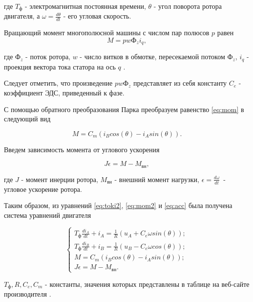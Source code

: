 где $T_{\text{ф}}$ - электромагнитная постоянная времени, $\theta$ - угол
поворота ротора двигателя, а $\omega=\frac{d\theta}{dt}$ - его угловая скорость.

Вращающий момент многополюсной машины с числом пар полюсов $p$ равен
\begin{equation}
  M=pw\text{Ф}_zi_q,
  \label{eq:mom}
\end{equation}

где $\text{Ф}_z$ - поток ротора, $w$ - число витков в обмотке, пересекаемой 
потоком $\text{Ф}_z$, $i_q$ - проекция вектора тока статора на 
ось $q$ \cite{БеленькийМикеровМоментныйПривод}.

Следует отметить, что произведение $pw\text{Ф}_z$ представляет из себя константу $C_e$ - 
коэффициент ЭДС, приведенный к фазе.

С помощью обратного преобразования Парка преобразуем равенство \ref{eq:mom} в
следующий вид

\begin{equation}
  M=C_m(i_Bcos(\theta)-i_Asin(\theta)).
  \label{eq:mom2}
\end{equation}

Введем зависимость момента от углового ускорения

\begin{equation}
  J\epsilon=M - M_{\text{вн}},
  \label{eq:acc}
\end{equation}

где $J$ - момент инерции ротора, $M_{\text{вн}}$ - внешний момент нагрузки, $\epsilon=\frac{d\omega}{dt}$~- угловое ускорение ротора.

Таким образом, из уравнений \ref{eq:toki2}, \ref{eq:mom2} и \ref{eq:acc} 
была получена система уравнений двигателя 

\begin{equation}
  \begin{cases}
    T_{\text{ф}}\frac{di_A}{dt}+i_A=\frac{1}{R}(u_A+C_e\omega sin(\theta));
    \\
    T_{\text{ф}}\frac{di_B}{dt}+i_B=\frac{1}{R}(u_B-C_e\omega cos(\theta));
    \\
    M=C_m(i_Bcos(\theta)-i_Asin(\theta));
    \\
    J\epsilon=M - M_{\text{вн}}.
  \end{cases}
  \label{eq:sys}
\end{equation}

$T_{\text{ф}}, R, C_e, C_m$ - константы, значения которых представлены в таблице на 
веб-сайте производителя \cite{ДБМ63}.

